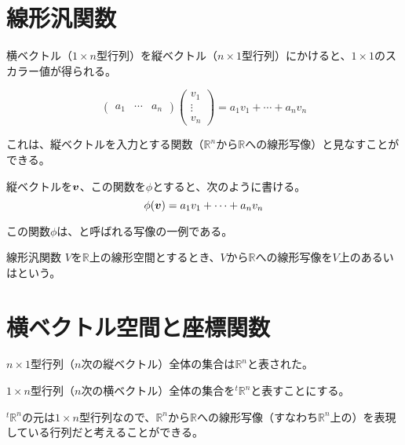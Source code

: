 \documentclass[../../../topic_linear-algebra]{subfiles}
\begin{document}
\sectionline
\section{線形汎関数}

横ベクトル（$1 \times n$型行列）を縦ベクトル（$n \times 1$型行列）にかけると、$1 \times 1$のスカラー値が得られる。

\begin{equation*}
  \begin{pmatrix}
    a_1 & \cdots & a_n
  \end{pmatrix} \begin{pmatrix}
    v_1    \\
    \vdots \\
    v_n
  \end{pmatrix}
  = a_1 v_1 + \cdots + a_n v_n
\end{equation*}

\br

これは、縦ベクトルを入力とする関数（$\mathbb{R}^n$から$\mathbb{R}$への線形写像）と見なすことができる。

縦ベクトルを$\vb*{v}$、この関数を$\phi$とすると、次のように書ける。
\begin{equation*}
  \phi(\vb*{v}) = a_1 v_1 + \cdots + a_n v_n
\end{equation*}

この関数$\phi$は、と呼ばれる写像の一例である。

\begin{definition}{線形汎関数}
  $V$を$\mathbb{R}$上の線形空間とするとき、$V$から$\mathbb{R}$への線形写像を$V$上のあるいはという。
\end{definition}

\sectionline
\section{横ベクトル空間と座標関数}

$n \times 1$型行列（$n$次の縦ベクトル）全体の集合は$\mathbb{R}^n$と表された。

$1 \times n$型行列（$n$次の横ベクトル）全体の集合を${}^t\mathbb{R}^n$と表すことにする。

\br

${}^t\mathbb{R}^n$の元は$1 \times n$型行列なので、$\mathbb{R}^n$から$\mathbb{R}$への線形写像（すなわち$\mathbb{R}^n$上の）を表現している行列だと考えることができる。
\end{document}
